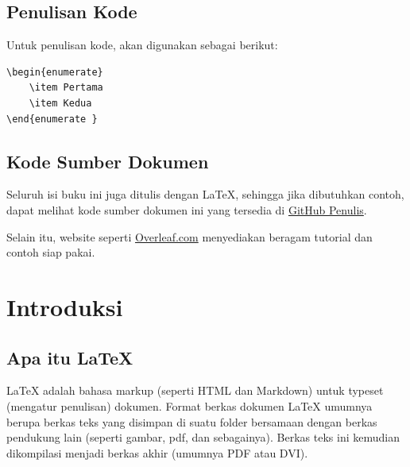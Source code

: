 \documentclass{book} %
\begin{document}
	\section{Penulisan Kode}
	Untuk penulisan kode, akan digunakan sebagai berikut:

    \begin{verbatim}
\begin{enumerate}
    \item Pertama
    \item Kedua
\end{enumerate }
    \end{verbatim}

    \section{Kode Sumber Dokumen}

    Seluruh isi buku ini juga ditulis dengan \LaTeX{}, sehingga jika dibutuhkan contoh, dapat melihat
    kode sumber dokumen ini yang tersedia di \href{https://github.com/mekatronik-achmadi/my_latexbook/blob/master/Modul/LaTex/latex_beginner.tex}{GitHub Penulis}.

    \bigskip

    Selain itu, website seperti \href{https://www.overleaf.com/}{Overleaf.com} menyediakan beragam tutorial dan contoh siap pakai.


    \mainmatter %

    \newpage
    \chapter{Introduksi}

    \section{Apa itu \LaTeX{}}

    \LaTeX{} adalah bahasa markup (seperti HTML dan Markdown) untuk typeset (mengatur penulisan) dokumen.
    Format berkas dokumen \LaTeX{} umumnya berupa berkas teks yang disimpan di suatu folder
    bersamaan dengan berkas pendukung lain (seperti gambar, pdf, dan sebagainya).
    Berkas teks ini kemudian dikompilasi menjadi berkas akhir (umumnya PDF atau DVI).
\end{document}
